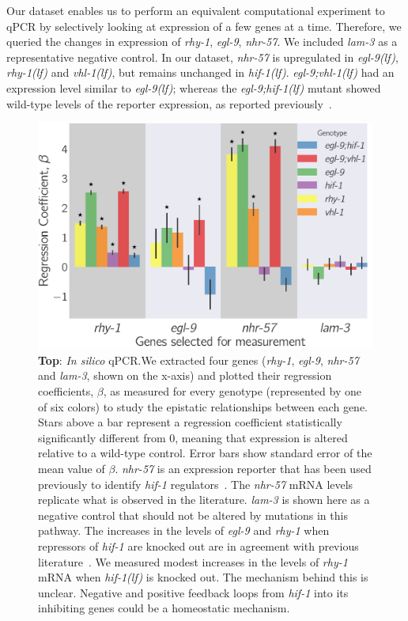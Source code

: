 \documentclass[9pt,twocolumn,twoside]{pnas-new}
\newcommand{\gene}[1]{\emph{#1}}
\newcommand{\nhr}{\emph{nhr-57}}
\newcommand{\lam}{\emph{lam-3}}
\newcommand{\egl}{\emph{egl-9(lf)}}
\newcommand{\rhy}{\emph{rhy-1(lf)}}
\newcommand{\vhl}{\emph{vhl-1(lf)}}
\newcommand{\eglvhl}{\emph{egl-9;vhl-1(lf)}}
\newcommand{\eglhif}{\emph{egl-9;hif-1(lf)}}
\newcommand{\hif}{\emph{hif-1(lf)}}
\begin{document}
Our dataset enables us to perform an equivalent computational experiment to qPCR
by selectively looking at expression of a few genes at a time. Therefore, we
queried the changes in expression of \gene{rhy-1}, \gene{egl-9}, \nhr{}. We included
\lam{} as a representative negative control. In our dataset, \nhr{} is upregulated in
\egl{}, \rhy{} and \vhl{}, but remains unchanged in \hif{}.
\eglvhl{} had an expression level similar to \egl{}; whereas the
\eglhif{} mutant showed wild-type levels of the reporter expression, as reported
previously~\cite{Shen2006}.

\begin{figure}[tbhp]
\centering
\includegraphics[width=\linewidth]{figs/qpcr.pdf}
\caption{
\textbf{Top}: \emph{In silico} qPCR.\@ We extracted
four genes (\gene{rhy-1}, \gene{egl-9}, \nhr{} and \lam{}, shown on the x-axis)
and plotted their regression coefficients, $\beta$, as measured for every
genotype (represented by one of six colors) to study the epistatic relationships
between each gene. Stars above a bar represent a regression coefficient
statistically significantly different from 0, meaning that expression is altered
relative to a wild-type control. Error bars show standard error of the mean
value of $\beta$. \nhr{} is an expression reporter that has been used previously
to identify \gene{hif-1} regulators~\cite{Shen2006,Shao2009}. The \nhr{} mRNA
levels replicate what is observed in the literature. \lam{} is shown here as a
negative control that should not be altered by mutations in this pathway. The
increases in the levels of \gene{egl-9} and \gene{rhy-1} when repressors of
\gene{hif-1} are knocked out are in agreement with previous
literature~\cite{Powell-Coffman2010}. We measured modest increases in the levels
of \gene{rhy-1} mRNA when \hif{} is knocked out. The mechanism behind this is
unclear. Negative and positive feedback loops from \gene{hif-1} into its
inhibiting genes could be a homeostatic mechanism.
}
\label{fig:qpcr}
\end{figure}
\end{document}
